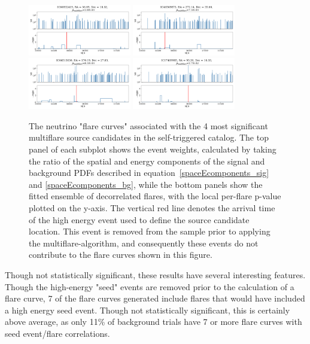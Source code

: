 \begin{figure}[h]
\centering
\includegraphics[width=0.4\textwidth]{figs/66932419.png}
\includegraphics[width=0.4\textwidth]{figs/46569873.png}
\includegraphics[width=0.4\textwidth]{figs/64513030.png}
\includegraphics[width=0.4\textwidth]{figs/17469985.png}
\caption{The neutrino "flare curves" associated with the 4 most significant multiflare source candidates in the self-triggered catalog. The top panel of each subplot shows the event weights, calculated by taking the ratio of the spatial and energy components of the signal and background PDFs described in equation~\ref{spaceEcomponents_sig} and \ref{spaceEcomponents_bg}, while the bottom panels show the fitted ensemble of decorrelated flares, with the local per-flare p-value plotted on the y-axis. The vertical red line denotes the arrival time of the high energy event used to define the source candidate location. This event is removed from the sample prior to applying the multiflare-algorithm, and consequently these events do not contribute to the flare curves shown in this figure.}
\label{fig:stcurves}
\end{figure}


Though not statistically significant, these results have several interesting features. Though the high-energy "seed" events are removed prior to the calculation of a flare curve, 7 of the flare curves generated include flares that would have included a high energy seed event. Though not statistically significant, this is certainly above average, as only 11\% of background trials have 7 or more flare curves with seed event/flare correlations. 



